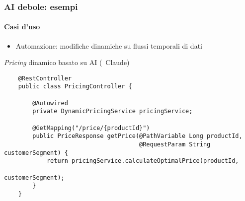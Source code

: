 \begin{frame}[t,fragile] \frametitle{AI debole: esempi}
	\framesubtitle{Casi d'uso}
		\begin{itemize}[leftmargin=10pt,align=right]
			\item[\alert{\faArrowCircleRight}] \alert{Automazione:} modifiche dinamiche su flussi temporali di dati
		\end{itemize}
		\vspace*{.3cm}
    	\begin{block}{\textit{Pricing} dinamico basato su AI (\textcopyright\ Claude)}
            \begin{verbatim}
    @RestController
    public class PricingController {
    
        @Autowired
        private DynamicPricingService pricingService;

        @GetMapping("/price/{productId}")
        public PriceResponse getPrice(@PathVariable Long productId,
                                      @RequestParam String customerSegment) {
            return pricingService.calculateOptimalPrice(productId,
                                                        customerSegment);
        }
    }
			\end{verbatim}
    	\end{block}
\end{frame}
%
